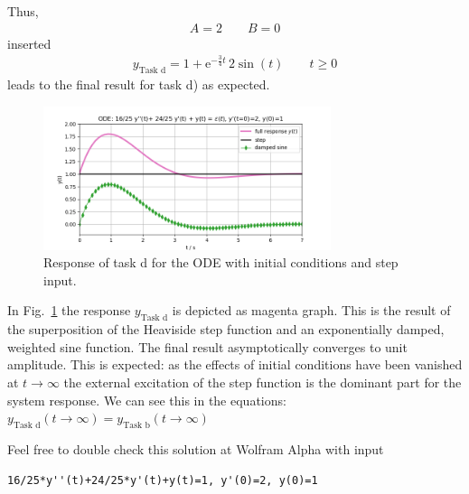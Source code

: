 Thus,
\begin{align}
A = 2\qquad B = 0
\end{align}
inserted
\begin{align}
\boxed{
y_\text{Task d} =
1+\mathrm{e}^{-\frac{3}{4} t}
\, 2 \sin(t)\qquad t \geq 0
}
\end{align}
leads to the final result for task d) as expected.
%
\begin{figure}[b!]
\centering
\includegraphics[width=0.75\textwidth]{../laplace_transform/response_full}
\caption{Response of task d for the ODE with initial conditions and step input.}
\label{fig:response_full}
\end{figure}
%
In Fig.~\ref{fig:response_full} the response $y_\text{Task d} $ is depicted as
magenta graph. This is the result of the superposition of the Heaviside step
function and an exponentially damped, weighted sine function.
The final result asymptotically converges to unit amplitude.
%
This is expected: as the effects of initial conditions have been vanished at $t\to\infty$
the external excitation of the step function is the dominant part for the system
response.
%
We can see this in the equations: $y_\text{Task d}(t\to\infty) = y_\text{Task b}(t\to\infty)$

Feel free to double check this solution at Wolfram Alpha with input
\begin{verbatim}
16/25*y''(t)+24/25*y'(t)+y(t)=1, y'(0)=2, y(0)=1
\end{verbatim}





